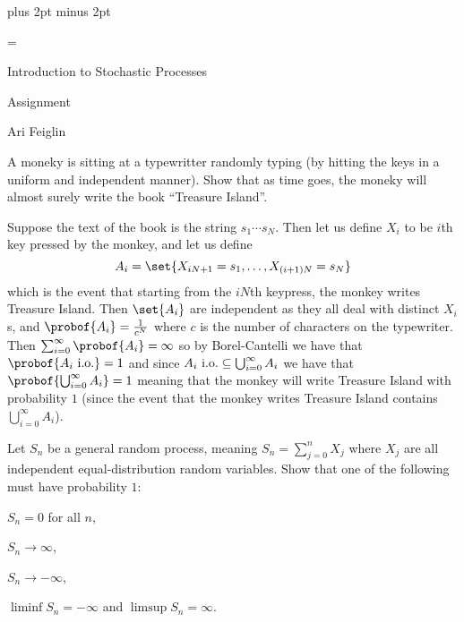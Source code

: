 

\parindent=0cm
\parskip=3pt plus 2pt minus 2pt





\footline={}

\def\printmcount{\the\counter{section}.\the\counter{math counter}}
\setcounter{section}{6}


{

    \centerline{Introduction to Stochastic Processes}
    \smallskip
    \centerline{Assignment \the{}}
    \centerline{Ari Feiglin}

\eppbox}

\bigskip

\bexerc

    A moneky is sitting at a typewritter randomly typing (by hitting the keys in a uniform and independent manner).
    Show that as time goes, the moneky will almost surely write the book ``Treasure Island''.

\eexerc

Suppose the text of the book is the string $s_1\cdots s_N$.
Then let us define $X_i$ to be $i$th key pressed by the monkey, and let us define
$$ A_i = \set{X_{iN+1}=s_1,\dots,X_{(i+1)N}=s_N} $$
which is the event that starting from the $iN$th keypress, the monkey writes Treasure Island.
Then $\set{A_i}$ are independent as they all deal with distinct $X_i$s, and $\probof{A_i}=\frac1{c^N}$ where $c$ is the number of characters on the typewriter.
Then $\sum_{i=0}^\infty\probof{A_i}=\infty$ so by Borel-Cantelli we have that $\probof{A_i\hbox{ i.o.}}=1$ and since $A_i\hbox{ i.o.}\subseteq\bigcup_{i=0}^\infty A_i$ we have that
$\probof{\bigcup_{i=0}^\infty A_i}=1$ meaning that the monkey will write Treasure Island with probability $1$ (since the event that the monkey writes Treasure Island contains $\bigcup_{i=0}^\infty A_i$). 

\bexerc

    Let $S_n$ be a general random process, meaning $S_n=\sum_{j=0}^nX_j$ where $X_j$ are all independent equal-distribution random variables.
    Show that one of the following must have probability $1$:
    \benum
        \item $S_n=0$ for all $n$,
        \item $S_n\to\infty$,
        \item $S_n\to-\infty$,
        \item $\liminf S_n=-\infty$ and $\limsup S_n=\infty$.
    \eenum

